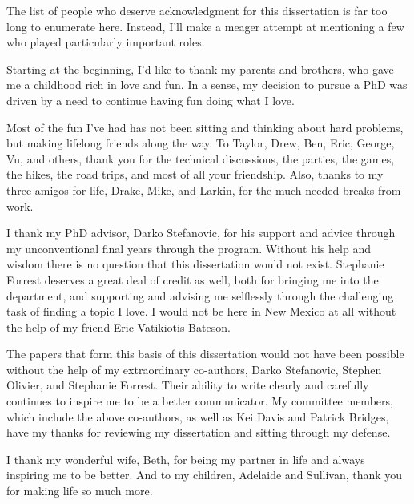 \documentclass[botnum]{unmeethesis}
\begin{document}
\begin{acknowledgments}
  \vspace{1.1in}
  The list of people who deserve acknowledgment for this dissertation is far too
  long to enumerate here. Instead, I'll make a meager attempt at mentioning a
  few who played particularly important roles. 

  Starting at the beginning, I'd like to thank my parents and brothers, who gave
  me a childhood rich in love and fun. In a sense, my decision to pursue a PhD
  was driven by a need to continue having fun doing what I love.  

  Most of the fun I've had has not been sitting and thinking about hard
  problems, but making lifelong friends along the way. To Taylor, Drew, Ben,
  Eric, George, Vu, and others, thank you for the technical discussions, the
  parties, the games, the hikes, the road trips, and most of all your
  friendship. Also, thanks to my three amigos for life, Drake, Mike, and Larkin,
  for the much-needed breaks from work. 

  I thank my PhD advisor, Darko Stefanovic, for his support and advice through
  my unconventional final years through the program. Without his help and
  wisdom there is no question that this dissertation would not exist. Stephanie
  Forrest deserves a great deal of credit as well, both for bringing me into the
  department, and supporting and advising me selflessly through the challenging
  task of finding a topic I love. I would not be here in New Mexico at all
  without the help of my friend Eric Vatikiotis-Bateson. 

  The papers that form this basis of this dissertation would not have been
  possible without the help of my extraordinary co-authors, Darko Stefanovic,
  Stephen Olivier, and Stephanie Forrest. Their ability to write clearly and
  carefully continues to inspire me to be a better communicator. My committee
  members, which include the above co-authors, as well as Kei Davis and Patrick
  Bridges, have my thanks for reviewing my dissertation and sitting through my
  defense. 

  I thank my wonderful wife, Beth, for being my partner in life and always
  inspiring me to be better. And to my children, Adelaide and Sullivan, thank
  you for making life so much more.
\end{acknowledgments}

\maketitleabstract %
\end{document}

